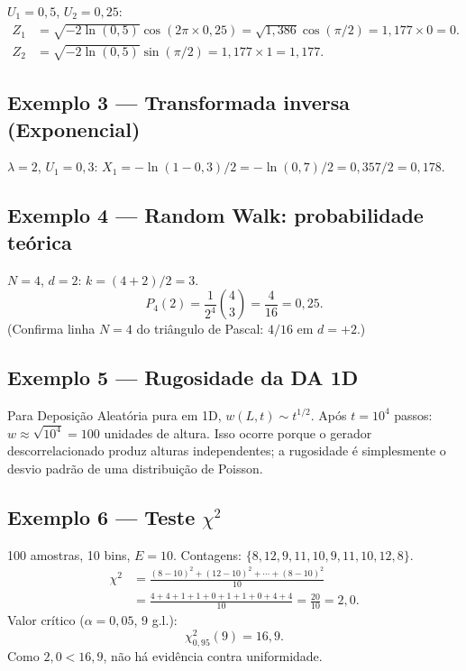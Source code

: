 \documentclass[12pt,a4paper]{article}
\begin{document}
$U_1 = 0{,}5$, $U_2 = 0{,}25$:
\begin{align*}
Z_1 &= \sqrt{-2\ln(0{,}5)}\cos(2\pi \times 0{,}25) = \sqrt{1{,}386}\cos(\pi/2) = 1{,}177 \times 0 = 0.\\
Z_2 &= \sqrt{-2\ln(0{,}5)}\sin(\pi/2) = 1{,}177 \times 1 = 1{,}177.
\end{align*}

\subsection*{Exemplo 3 --- Transformada inversa (Exponencial)}

$\lambda = 2$, $U_1 = 0{,}3$: $X_1 = -\ln(1 - 0{,}3)/2 = -\ln(0{,}7)/2 = 0{,}357/2 = 0{,}178$.

\subsection*{Exemplo 4 --- Random Walk: probabilidade te\'orica}

$N = 4$, $d = 2$: $k = (4+2)/2 = 3$.
\[
  P_4(2) = \frac{1}{2^4}\binom{4}{3} = \frac{4}{16} = 0{,}25.
\]
(Confirma linha $N=4$ do tri\^angulo de Pascal: $4/16$ em $d=+2$.)

\subsection*{Exemplo 5 --- Rugosidade da DA 1D}

Para Deposi\c{c}\~ao Aleat\'oria pura em 1D, $w(L,t) \sim t^{1/2}$. Ap\'os $t = 10^4$ passos: $w \approx \sqrt{10^4} = 100$ unidades de altura. Isso ocorre porque o gerador descorrelacionado produz alturas independentes; a rugosidade \'e simplesmente o desvio padr\~ao de uma distribui\c{c}\~ao de Poisson.

\subsection*{Exemplo 6 --- Teste $\chi^2$}

100 amostras, 10 bins, $E = 10$. Contagens: $\{8, 12, 9, 11, 10, 9, 11, 10, 12, 8\}$.
\begin{align*}
  \chi^2
  &= \frac{(8-10)^2 + (12-10)^2 + \cdots + (8-10)^2}{10} \\
  &= \frac{4+4+1+1+0+1+1+0+4+4}{10} = \frac{20}{10} = 2{,}0.
\end{align*}
Valor cr\'itico ($\alpha=0{,}05$, 9 g.l.):
\[
  \chi^2_{0{,}95}(9) = 16{,}9.
\]
Como $2{,}0 < 16{,}9$, n\~ao h\'a evid\^encia contra uniformidade.
\end{document}
